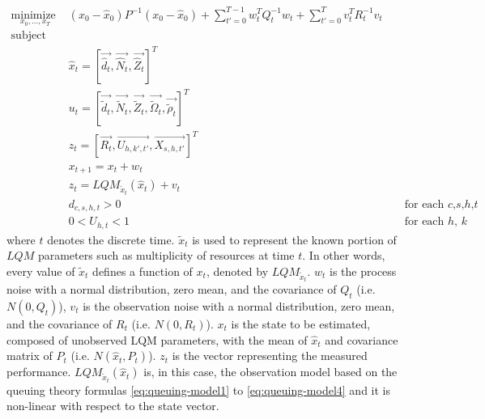 \begin{align*} 
 \underset{x_0,...,x_T}{\text{minimize }}  
   &  (x_0-\hat{x}_0)P^{-1}(x_0-\hat{x}_0)
 	 + \sum_{t'=0}^{T-1} w^T_t Q^{-1}_t w_t 
	 + \sum_{t'=0}^{T}  v^T_t R^{-1}_t v_t \nonumber  \\ 
    \text{subject to:} \nonumber \\   
    & \hat{x}_t=[\overrightarrow{\hat{d}_t},\overrightarrow{\hat{N}_t},\overrightarrow{\hat{Z}_t}]^T  \nonumber \\  
    & u_t=[\overrightarrow{\tilde{d}_t},\overrightarrow{\tilde{N}_t},\overrightarrow{\tilde{Z}_t},\overrightarrow{\tilde{\Omega}_t}, \overrightarrow{\tilde{\rho}_t}]^T  \nonumber \\   
    & z_t=[\overrightarrow{R_t},\overrightarrow{U_{h,k',t'}},\overrightarrow{X_{s,h,t'}}]^T  \nonumber \\   
    & x_{t + 1} = x_t+w_t \nonumber \\     
    & z_t = LQM_{\tilde{x}_t}(\hat{x}_t)+v_t  \nonumber \\
    &  d_{c,s,h,t}>0  && \text{  for each $c$,$s$,$h$,$t$}  \nonumber \\  
    &  0<U_{h,t}< 1 && \text{ for each $h$, $k$} \nonumber
\end{align*} 
where 
 $t$ denotes the discrete time. 
 $\tilde{x}_t$ is used to represent the known portion of $LQM$ parameters such as multiplicity of resources at time $t$. In other words, every value of $\tilde{x}_t$ defines a function of $x_t$, denoted by $LQM_{\tilde{x}_t}$. 
 $w_t$ is the process noise with a normal distribution, zero mean, and the covariance of $Q_t$ (i.e. $N(0,Q_t)$),  
 $v_t$ is the observation noise with a normal distribution, zero mean, and the covariance of $R_t$ (i.e. $N(0,R_t)$).  
 $x_t$ is the state to be estimated, composed of unobserved LQM parameters, with the mean of $\hat{x}_t$ and covariance matrix of $P_t$ (i.e. $N(\hat{x}_t,P_t)$).
 $z_t$ is the vector representing the measured performance.  
 $LQM_{\tilde{x}_t}(\hat{x}_t)$ is, in this case, the observation model based on the queuing theory formulas \ref{eq:queuing-model1} to \ref{eq:queuing-model4} and it is non-linear with respect to the state vector.   

